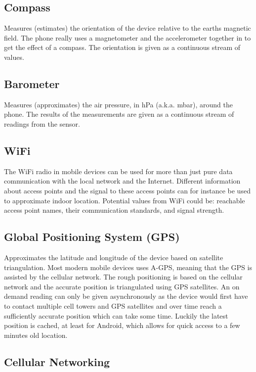 \subsection{Compass}
\label{sub:compass}
Measures (estimates) the orientation of the device relative to the earths magnetic field. The phone really uses a magnetometer and the accelerometer together in to get the effect of a compass. The orientation is given as a continuous stream of values.

\subsection{Barometer}
\label{sub:barometer}
Measures (approximates) the air pressure, in hPa (a.k.a. mbar), around the phone. The results of the measurements are given as a continuous stream of readings from the sensor. 

\subsection{WiFi}
\label{sub:wifi}

The WiFi radio in mobile devices can be used for more than just pure data communication with the local network and the Internet. Different information about access points and the signal to these access points can for instance be used to approximate indoor location.  
Potential values from WiFi could be: reachable access point names, their communication standards, and signal strength.

\subsection{Global Positioning System (GPS)}
\label{sub:gps}
Approximates the latitude and longitude of the device based on satellite triangulation. Most modern mobile devices uses A-GPS, meaning that the GPS is assisted by the cellular network. The rough positioning is based on the cellular network and the accurate position is triangulated using GPS satellites. An on demand reading can only be given asynchronously as the device would first have to contact multiple cell towers and GPS satellites and over time reach a sufficiently accurate position which can take some time. Luckily the latest position is cached, at least for Android, which allows for quick access to a few minutes old location.   

\subsection{Cellular Networking}
\label{sub:cellular_networking}

